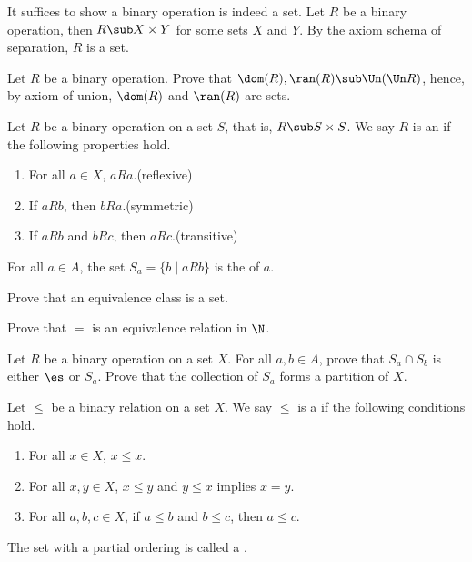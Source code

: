 \documentclass[10pt]{article}
\begin{document}
\par
It suffices to show a binary operation is indeed a set. Let $R$ be a binary operation, then $R\sub X\times Y$ for some sets $X$ and $Y$. By the axiom schema of separation, $R$ is a set. 
\begin{problem}
    Let $R$ be a binary operation. Prove that $\dom(R),\ran(R)\sub\Un(\Un R)$, hence, by axiom of union, $\dom(R)$ and $\ran(R)$ are sets.
\end{problem}
\begin{definition}
    Let $R$ be a binary operation on a set $S$, that is, $R\sub S\times S$. We say $R$ is an  if the following properties hold.
    \begin{enumerate}
        \item For all $a\in X$, $aRa$.\hfill(reflexive)
        \item If $aRb$, then $bRa$.\hfill(symmetric)
        \item If $aRb$ and $bRc$, then $aRc$.\hfill(transitive)
    \end{enumerate}
    For all $a\in A$, the set ${S}_{a}=\{b\mid aRb\}$ is the  of $a$. 
\end{definition}
\begin{problem}
    Prove that an equivalence class is a set.
\end{problem}
\begin{problem}
    Prove that $=$ is an equivalence relation in $\N$.
\end{problem}
\begin{problem}
    Let $R$ be a binary operation on a set $X$. For all $a,b\in A$, prove that ${S}_{a}\cap{S}_{b}$ is either $\es$ or ${S}_{a}$. Prove that the collection of ${S}_{a}$ forms a partition of $X$.
\end{problem}
\begin{definition}
    Let $\le$ be a binary relation on a set $X$. We say $\le$ is a  if the following conditions hold.
    \begin{enumerate}
        \item For all $x\in X$, $x\le x$.
        \item For all $x,y\in X$, $x\le y$ and $y\le x$ implies $x=y$.
        \item For all $a,b,c\in X$, if $a\le b$ and $b\le c$, then $a\le c$.
    \end{enumerate}
    The set with a partial ordering is called a .
\end{definition}
\end{document}
